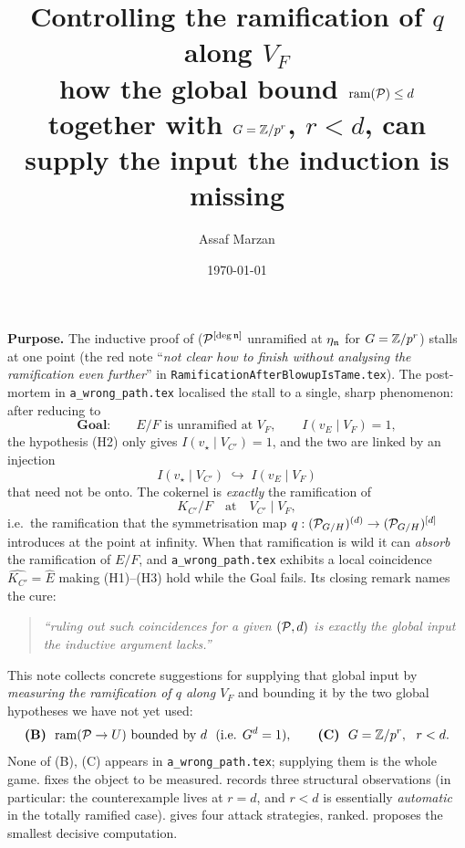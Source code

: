 \documentclass[11pt]{article}
\title{Controlling the ramification of $q$ along $V_F$\\[2pt]
       {\large how the global bound $\mathrm{ram}(\mathcal{P})\le d$ together with
        $G=\mathbb{Z}/p^r$, $r<d$, can supply the input the induction is missing}}
\author{Assaf Marzan}
\date{\today}
\begin{document}
\maketitle

\noindent\textbf{Purpose.}
The inductive proof of
($\mathcal{P}^{[\deg\mathfrak{n}]}$ unramified at $\eta_{\mathfrak{n}}$ for $G=\mathbb{Z}/p^r$) stalls at one
point (the red note ``\emph{not clear how to finish without analysing the
ramification even further}'' in \texttt{RamificationAfterBlowupIsTame.tex}).
The post-mortem in \texttt{a\_wrong\_path.tex} localised the stall to a single,
sharp phenomenon: after reducing to
\[
\textbf{Goal:}\qquad E/F \text{ is unramified at } V_F,\qquad I(v_E\mid V_F)=1,
\]
the hypothesis (H2) only gives $I(v_\star\mid V_{C'})=1$, and the two are linked
by an injection
\begin{equation}\label{eq:inj}
I(v_\star\mid V_{C'})\;\hookrightarrow\;I(v_E\mid V_F)
\end{equation}
that need not be onto. The cokernel is \emph{exactly} the ramification of
\[
K_{C'}/F \quad\text{at}\quad V_{C'}\mid V_F,
\]
i.e.\ the ramification that the symmetrisation map
$q:(\mathcal{P}_{G/H})^{(d)}\to(\mathcal{P}_{G/H})^{[d]}$ introduces at the point at infinity.
When that ramification is wild it can \emph{absorb} the ramification of $E/F$,
and \texttt{a\_wrong\_path.tex} exhibits a local coincidence
$\widehat{K_{C'}}=\widehat E$ making (H1)--(H3) hold while the Goal fails. Its
closing remark names the cure:

\begin{quote}\itshape
``ruling out such coincidences for a given $(\mathcal{P},d)$ is exactly the global input
the inductive argument lacks.''
\end{quote}

This note collects concrete suggestions for supplying that global input by
\emph{measuring the ramification of $q$ along $V_F$} and bounding it by the two
global hypotheses we have not yet used:
\begin{equation}\label{eq:hyp}
\textbf{(B)}\ \ \mathrm{ram}(\cP\to U)\ \text{bounded by}\ d\ \ (\text{i.e. }G^d=1),
\qquad
\textbf{(C)}\ \ G=\Z/p^r,\ \ r<d.
\end{equation}
None of (B), (C) appears in \texttt{a\_wrong\_path.tex}; supplying them is the
whole game.  fixes the object to be measured.
 records three structural observations (in particular: the
counterexample lives at $r=d$, and $r<d$ is essentially \emph{automatic} in the
totally ramified case).  gives four attack strategies,
ranked.  proposes the smallest decisive computation.
\end{document}
